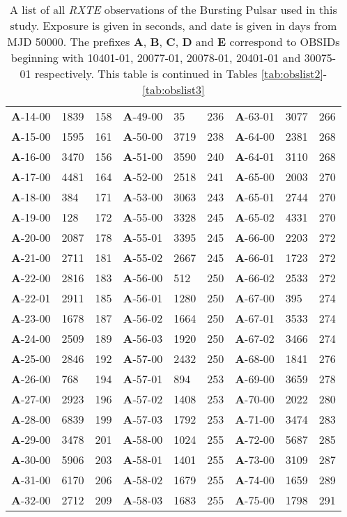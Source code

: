 \begin{table*}
\begin{tabular}{lllllllll}
\textbf{A}-14-00&1839&158&\textbf{A}-49-00&35&236&\textbf{A}-63-01&3077&266\\
\textbf{A}-15-00&1595&161&\textbf{A}-50-00&3719&238&\textbf{A}-64-00&2381&268\\
\textbf{A}-16-00&3470&156&\textbf{A}-51-00&3590&240&\textbf{A}-64-01&3110&268\\
\textbf{A}-17-00&4481&164&\textbf{A}-52-00&2518&241&\textbf{A}-65-00&2003&270\\
\textbf{A}-18-00&384&171&\textbf{A}-53-00&3063&243&\textbf{A}-65-01&2744&270\\
\textbf{A}-19-00&128&172&\textbf{A}-55-00&3328&245&\textbf{A}-65-02&4331&270\\
\textbf{A}-20-00&2087&178&\textbf{A}-55-01&3395&245&\textbf{A}-66-00&2203&272\\
\textbf{A}-21-00&2711&181&\textbf{A}-55-02&2667&245&\textbf{A}-66-01&1723&272\\
\textbf{A}-22-00&2816&183&\textbf{A}-56-00&512&250&\textbf{A}-66-02&2533&272\\
\textbf{A}-22-01&2911&185&\textbf{A}-56-01&1280&250&\textbf{A}-67-00&395&274\\
\textbf{A}-23-00&1678&187&\textbf{A}-56-02&1664&250&\textbf{A}-67-01&3533&274\\
\textbf{A}-24-00&2509&189&\textbf{A}-56-03&1920&250&\textbf{A}-67-02&3466&274\\
\textbf{A}-25-00&2846&192&\textbf{A}-57-00&2432&250&\textbf{A}-68-00&1841&276\\
\textbf{A}-26-00&768&194&\textbf{A}-57-01&894&253&\textbf{A}-69-00&3659&278\\
\textbf{A}-27-00&2923&196&\textbf{A}-57-02&1408&253&\textbf{A}-70-00&2022&280\\
\textbf{A}-28-00&6839&199&\textbf{A}-57-03&1792&253&\textbf{A}-71-00&3474&283\\
\textbf{A}-29-00&3478&201&\textbf{A}-58-00&1024&255&\textbf{A}-72-00&5687&285\\
\textbf{A}-30-00&5906&203&\textbf{A}-58-01&1401&255&\textbf{A}-73-00&3109&287\\
\textbf{A}-31-00&6170&206&\textbf{A}-58-02&1679&255&\textbf{A}-74-00&1659&289\\
\textbf{A}-32-00&2712&209&\textbf{A}-58-03&1683&255&\textbf{A}-75-00&1798&291\\
\hline
\hline
\end{tabular}
\caption[A list of all \textit{RXTE} observations of the Bursting Pulsar used in this thesis.]{A list of all \textit{RXTE} observations of the Bursting Pulsar used in this study.  Exposure is given in seconds, and date is given in days from MJD 50000.  The prefixes \textbf{A}, \textbf{B}, \textbf{C}, \textbf{D} and \textbf{E} correspond to OBSIDs beginning with 10401-01, 20077-01, 20078-01, 20401-01 and 30075-01 respectively.  This table is continued in Tables \ref{tab:obslist2}-\ref{tab:obslist3}}
\label{tab:obslist}
\end{table*}

